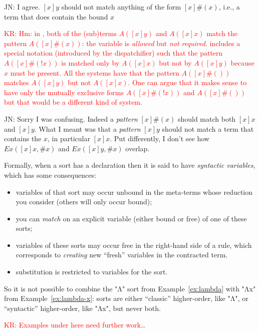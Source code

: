 \documentclass[letterpaper,11pt]{article}
\newcommand{\KR}[1]{\textcolor{red}{KR: #1}}
\newcommand{\JN}[1]{\textcolor{orange!70!black}{JN: #1}}
\begin{document}
\JN{I agree. $[x]y$ should not match anything of the form $[x]\#(x)$, i.e., a term that does contain
  the bound $x$}

\KR{Hm: in \CRSX, both of the (sub)terms $A([x]y)$ and $A([x]x)$ match the pattern $A([x]\#(x))$:
  the variable is \emph{allowed} but \emph{not required}. \CRSX3 includes a special notation
  (introduced by the dispatchifier) such that the pattern $A([x]\#(!x))$ is matched only by
  $A([x]x)$ but not by $A([x]y)$ because $x$ must be present. All the systems have that the pattern
  $A([x]\#())$ matches $A([x]y)$ but not $A([x]x)$. One can argue that it makes sense to have only
  the mutually exclusive forms $A([x]\#(!x))$ and $A([x]\#())$ but that would be a different kind of
  system.}

\JN{Sorry I was confusing. Indeed a \emph{pattern} $[x]\#(x)$ should match both $[x]x$ and
  $[x]y$. What I meant was that a \emph{pattern} $[x]y$ should not match a term that contains the
  $x$, in particular $[x]x$. Put differently, I don't see how $Ex([x]x,\#x)$ and $Ex([x]y,\#x)$
  overlap.}

Formally, when a sort has a  declaration then it is said to have \emph{syntactic
  variables}, which has some consequences:
\begin{itemize}

\item variables of that sort may occur unbound in the meta-terms whose reduction you consider
  (others will only occur bound);

\item you can \emph{match} on an explicit variable (either bound or free) of one of these sorts;

\item variables of these sorts may occur free in the right-hand side of a rule, which corresponds to
  \emph{creating} new ``fresh'' variables in the contracted term.

\item substitution is restricted to variables for the sort.

\end{itemize}
So it is not possible to combine the "Λ" sort from Example~\ref{ex:lambda} with "Λx" from
Example~\ref{ex:lambda-x}: sorts are either ``classic'' higher-order, like "Λ", or ``syntactic''
higher-order, like "Λx", but never both.





\KR{Examples under here need further work…}
\end{document}
